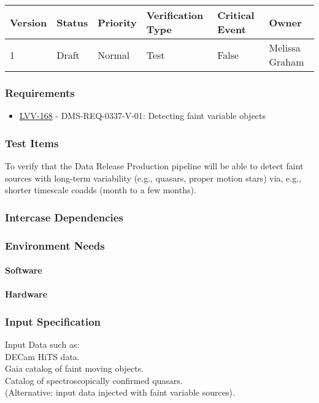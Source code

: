 \begin{longtable}[]{llllll}
\toprule
Version & Status & Priority & Verification Type & Critical Event & Owner
\\\midrule
1 & Draft & Normal &
Test & False & Melissa Graham
\\\bottomrule
\end{longtable}

\subsubsection{Requirements}
\begin{itemize}
\item \href{https://jira.lsstcorp.org/browse/LVV-168}{LVV-168} - DMS-REQ-0337-V-01: Detecting faint variable objects
\end{itemize}

\subsubsection{Test Items}
To verify that the Data Release Production pipeline will be able to
detect faint sources with long-term variability (e.g., quasars, proper
motion stars) via, e.g., shorter timescale coadds (month to a few
months).



\subsubsection{Intercase Dependencies}

\subsubsection{Environment Needs}

\paragraph{Software}

\paragraph{Hardware}

\subsubsection{Input Specification}
Input Data such as:\\
DECam HiTS data.\\
Gaia catalog of faint moving objects.\\
Catalog of spectroscopically confirmed quasars.\\
(Alternative: input data injected with faint variable sources).


